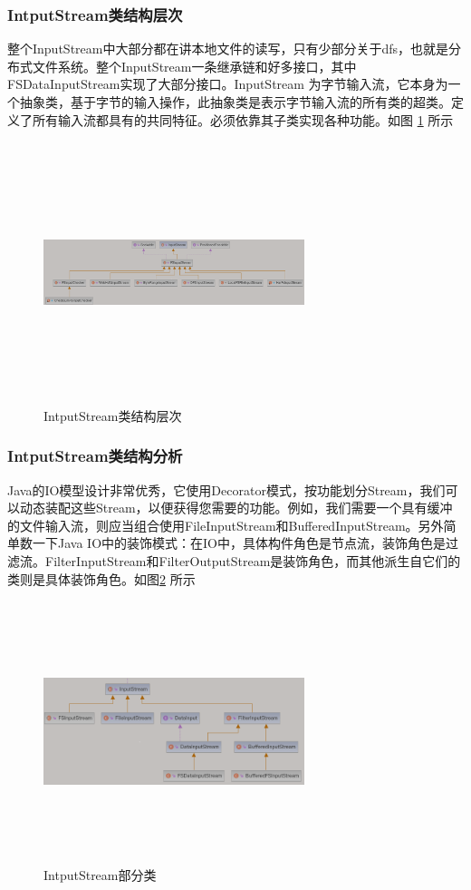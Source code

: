 	\subsubsection{IntputStream类结构层次} 
	整个InputStream中大部分都在讲本地文件的读写，只有少部分关于dfs，也就是分布式文件系统。整个InputStream一条继承链和好多接口，其中FSDataInputStream实现了大部分接口。InputStream 为字节输入流，它本身为一个抽象类，基于字节的输入操作，此抽象类是表示字节输入流的所有类的超类。定义了所有输入流都具有的共同特征。必须依靠其子类实现各种功能。如图 \ref{fig:graph1} 所示
	
	\begin{figure}
		\centering
	    \includegraphics[width=3in,height=3in]{UML/inputstream/hdfs-common-inputstream-diagram.png}
		\caption{IntputStream类结构层次}
		\label{fig:graph1}
	\end{figure}
	
	\subsubsection{IntputStream类结构分析} 
	Java的IO模型设计非常优秀，它使用Decorator模式，按功能划分Stream，我们可以动态装配这些Stream，以便获得您需要的功能。例如，我们需要一个具有缓冲的文件输入流，则应当组合使用FileInputStream和BufferedInputStream。另外简单数一下Java IO中的装饰模式：在IO中，具体构件角色是节点流，装饰角色是过滤流。FilterInputStream和FilterOutputStream是装饰角色，而其他派生自它们的类则是具体装饰角色。如图\ref{fig:graph2} 所示
	
	\begin{figure}
		\centering
		\includegraphics[width=3in,height=3in]{UML/inputstream/common-io-diagram.png}
		\caption{IntputStream部分类}
		\label{fig:graph2}
	\end{figure}
	
